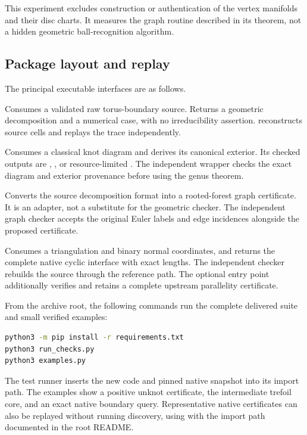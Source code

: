 This experiment excludes construction or authentication of the vertex
manifolds and their disc charts.  It measures the graph routine described
in its theorem, not a hidden geometric ball-recognition algorithm.

\subsection{Package layout and replay}

The principal executable interfaces are as follows.

\begin{description}[style=nextline]
\item[\code{decompose\_unused\_handles}]
Consumes a validated raw torus-boundary source.  Returns a geometric
decomposition and a numerical case, with no irreducibility assertion.
 reconstructs source cells and
replays the trace independently.
\item[\code{compile\_diagram\_initial\_core}]
Consumes a classical knot diagram and derives its canonical exterior.
Its checked outputs are , , or
resource-limited .  The independent wrapper checks
the exact diagram and exterior provenance before using the genus theorem.
\item[\code{kernel\_from\_decomposition}]
Converts the source decomposition format into a rooted-forest graph
certificate.  It is an adapter, not a substitute for the geometric
checker.  The independent graph checker accepts the original Euler labels
and edge incidences alongside the proposed certificate.
\item[\code{normal\_parallelity\_moment\_words}]
Consumes a triangulation and binary normal coordinates, and returns the
complete native cyclic interface with exact lengths.  The independent
checker rebuilds the source through the reference path.  The optional
 entry point additionally verifies
and retains a complete upstream parallelity certificate.
\end{description}

From the archive root, the following commands run the complete delivered
suite and small verified examples:
\begin{lstlisting}[language=bash]
python3 -m pip install -r requirements.txt
python3 run_checks.py
python3 examples.py
\end{lstlisting}
The test runner inserts the new code and pinned native snapshot into its
import path.  The examples show a positive unknot certificate, the
intermediate trefoil core, and an exact native boundary query.  Representative
native certificates can also be replayed without running discovery, using
 with the import path documented
in the root README.

